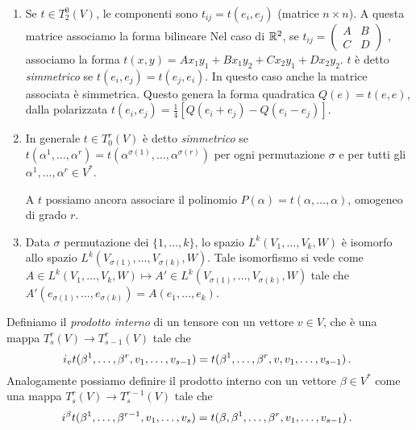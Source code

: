 \begin{example}
\begin{enumerate}
	\item Se $t\in T_2^0(V)$, le componenti sono $t_{ij} = t(e_i,e_j)$ (matrice $n\times n$). A questa matrice associamo la forma bilineare 
	Nel caso di $\mathbb R^2$, se $t_{ij} = \left(\begin{matrix}
	                                  A & B \\
	                                  C & D 
	                                 \end{matrix}\right)$
	, associamo la forma $t(x,y) = Ax_1y_1+Bx_1y_2+Cx_2y_1+Dx_2y_2$.
	$t$ è detto \emph{simmetrico} se $t(e_i,e_j) =t(e_j,e_i)$. In questo caso anche la matrice associata è simmetrica. Questo genera la forma quadratica $Q(e) = t(e,e)$, dalla polarizzata $t(e_i,e_j) = \frac 14 [Q(e_i+e_j)-Q(e_i-e_j)]$.
	\item In generale $t\in T_0^r(V)$ è detto \emph{simmetrico} se $t(\alpha^1,\dots,\alpha^r) = t(\alpha^{\sigma(1)},\dots,\alpha^{\sigma(r)})$ per ogni permutazione $\sigma$ e per tutti gli $\alpha^1,\dots,\alpha^r \in V^*$.
	
	A $t$ possiamo ancora associare il polinomio $P(\alpha) = t(\alpha,\dots,\alpha)$, omogeneo di grado $r$.
	\item Data $\sigma$ permutazione dei $\{1,\dots,k\}$, lo spazio $L^k(V_1,\dots,V_k,W)$ è isomorfo allo spazio $L^k(V_{\sigma(1)},\dots,V_{\sigma(k)},W)$.
	Tale isomorfismo si vede come $A \in L^k(V_1,\dots,V_k,W) \mapsto A'\in L^k(V_{\sigma(1)},\dots,V_{\sigma(k)},W)$ tale che $A'(e_{\sigma(1)},\dots,e_{\sigma(k)}) = A(e_1,\dots,e_k)$.
\end{enumerate}
\end{example}

\begin{definition} 
	Definiamo il \emph{prodotto interno} di un tensore con un vettore $v\in V$, che è una mappa $T_s^r(V)\to T_{s-1}^r(V)$ tale che
	\begin{equation*}
		i_vt(\beta^1,\dots,\beta^r,v_1,\dots,v_{s-1}) = t(\beta^1,\dots,\beta^r,v,v_1,\dots,v_{s-1})\, \text{. }
	\end{equation*}
	Analogamente possiamo definire il prodotto interno con un vettore $\beta \in V^*$ come una mappa $T_s^r(V)\to T_{s}^{r-1}(V)$ tale che
	\begin{equation*}
		i^\beta t(\beta^1,\dots,\beta^{r-1},v_1,\dots,v_s) = t(\beta,\beta^1,\dots,\beta^r,v_1,\dots,v_{s-1})\, \text{. }
	\end{equation*}
\end{definition}

